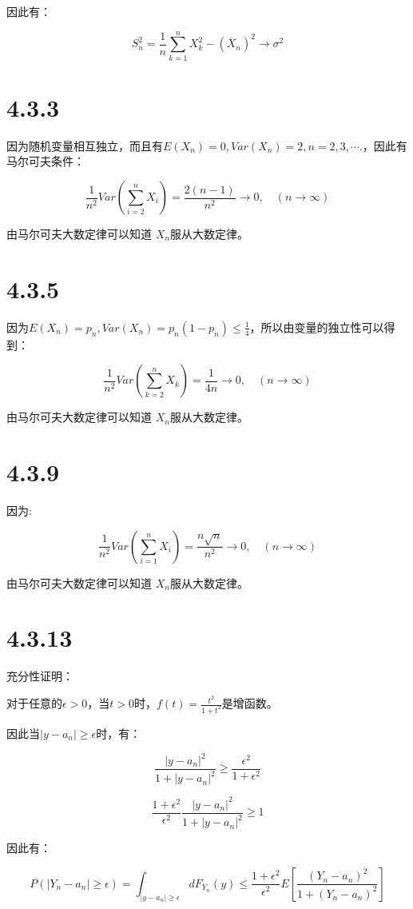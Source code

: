 \documentclass{article}
\begin{document}
因此有：

$$S^2_n=\frac1n\sum^n_{k=1}X^2_k-(\overline{X}_n)^2\rightarrow \sigma^2$$

\section{4.3.3}

因为随机变量相互独立，而且有$E(X_n)=0,Var(X_n)=2,n=2,3,\cdots.$，因此有马尔可夫条件：

$$\frac1{n^2}Var(\sum^n_{i=2}X_i)=\frac{2(n-1)}{n^2}\rightarrow 0,\quad (n\rightarrow \infty)$$

由马尔可夫大数定律可以知道 ${X_n}$服从大数定律。

\section{4.3.5}

因为$E(X_n)=p_n, Var(X_n)=p_n(1-p_n)\leq\frac14$，所以由变量的独立性可以得到：

$$\frac1{n^2}Var(\sum^n_{k=2}X_k)=\frac{1}{4n}\rightarrow 0,\quad (n\rightarrow \infty)$$


由马尔可夫大数定律可以知道 ${X_n}$服从大数定律。


\section{4.3.9}
因为:

$$\frac1{n^2}Var(\sum^n_{i=1}X_i)=\frac{n\sqrt{n}}{n^2}\rightarrow 0,\quad (n\rightarrow \infty)$$


由马尔可夫大数定律可以知道 ${X_n}$服从大数定律。



\section{4.3.13}

充分性证明：

对于任意的$\epsilon > 0$，当$t>0$时，$f(t)=\frac{t^2}{1+t^2}$是增函数。

因此当$|y-a_n|\geq\epsilon$时，有：

$$\frac{|y-a_n|^2}{1+|y-a_n|^2}\geq \frac{\epsilon^2}{1+\epsilon^2}$$

$$\frac{1+\epsilon^2}{\epsilon^2}\frac{|y-a_n|^2}{1+|y-a_n|^2}\geq1$$

因此有：

$$P(|Y_n-a_n|\geq \epsilon)=\int_{|y-a_n|\geq\epsilon}dF_{Y_n}(y)\leq\frac{1+\epsilon^2}{\epsilon^2}E[\frac{(Y_n-a_n)^2}{1+(Y_n-a_n)^2}]$$
\end{document}
